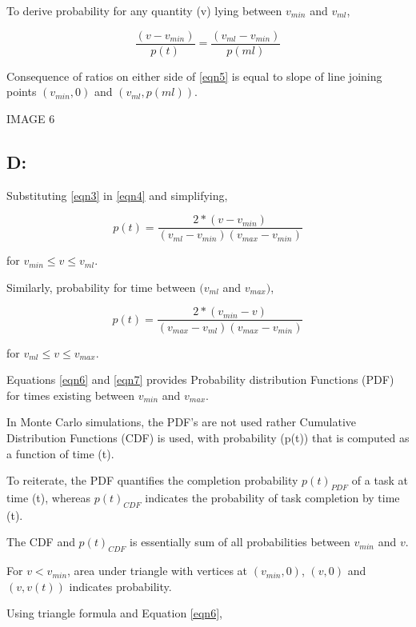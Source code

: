 To derive probability for any quantity (v) lying between $ v_{min} $ and $ v_{ml} $, 

\begin{equation}
\frac{(v - v_{min})}{ p(t) }  = \frac{(v_{ml} - v_{min})}{ p(ml) } 
\label{eqn5}
\end{equation}

Consequence of ratios on either side of \ref{eqn5} is equal to slope of line joining points $(v_{min}, 0)$ and $( v_{ml}, p(ml) )$.

IMAGE 6

\subsection{D: }
Substituting \ref{eqn3} in \ref{eqn4} and simplifying,

\begin{equation}
p(t)  = \frac{2* (v - v_{min})}{ (v_{ml} - v_{min}) (v_{max} - v_{min}) } 
\label{eqn6}
\end{equation}

for $ v_{min} \leqslant v \leqslant v_{ml}$.

Similarly, probability for time between $(v_{ml}$ and $ v_{max})$,

\begin{equation}
p(t)  = \frac{2* (v_{min} - v)}{ (v_{max} - v_{ml}) (v_{max} - v_{min}) } 
\label{eqn7}
\end{equation}

for $ v_{ml} \leqslant v \leqslant v_{max}$.

Equations \ref{eqn6} and \ref{eqn7} provides Probability distribution Functions (PDF) for times existing between $v_{min}$ and $v_{max}$. 


In Monte Carlo simulations, the PDF's are not used rather Cumulative Distribution Functions (CDF) is used, with probability (p(t)) that is computed as a function of time (t).

To reiterate, the PDF quantifies the completion probability $p(t)_{PDF}$ of a task at time (t), whereas $p(t)_{CDF}$ indicates the probability of task completion by time (t).

The CDF and $p(t)_{CDF}$ is essentially sum of all probabilities between $v_{min}$ and $v$. 


For $ v < v_{min}$, area under triangle with vertices at $(v_{min}, 0)$, $(v, 0)$ and $(v, v(t))$ indicates probability.

Using triangle formula and Equation \ref{eqn6}, 

